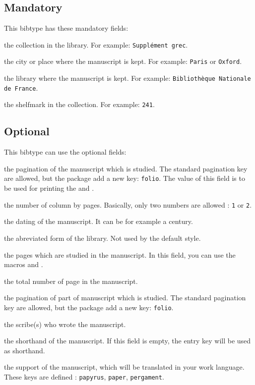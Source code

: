 \documentclass{ltxdockit}[2011/03/25]
\begin{document}
\subsection{Mandatory}
This bibtype has these mandatory fields:

\begin{fieldlist}

 the collection in the library. For example: \verb+Supplément grec+.

 the city or place where the manuscript is kept. For example: \verb+Paris+ or \verb+Oxford+. 

 the library where the manuscript is kept. For example: \verb+Bibliothèque Nationale de France+.


 the shelfmark in the collection. For example: \verb+241+.
\end{fieldlist}

\subsection{Optional}
This bibtype can use the optional fields:

\begin{fieldlist}

 the pagination of the manuscript which is studied. The standard pagination key are allowed, but the package add a new key: \texttt{folio}. The value of this field is to be used for printing the  and .

 the number of column by pages. Basically, only two numbers are allowed : \verb+1+ or \verb+2+.

 the dating of the manuscript. It can be for example a century.

 the abreviated form of the library. Not used by the default style.

 the pages which are studied in the manuscript. In this field, you can use the macros  and .

 the total number of page in the manuscript.


 the pagination of part of manuscript which is studied. The standard pagination key are allowed, but the package add a new key: \verb+folio+.

 the scribe(s) who wrote the manuscript.

 the shorthand of the manuscript. If this field is empty, the entry key will be used as shorthand.

 the support of the manuscript, which will be translated in your work language. These keys are defined : \texttt{papyrus}, \texttt{paper}, \texttt{pergament}.

\end{fieldlist}
\end{document}
